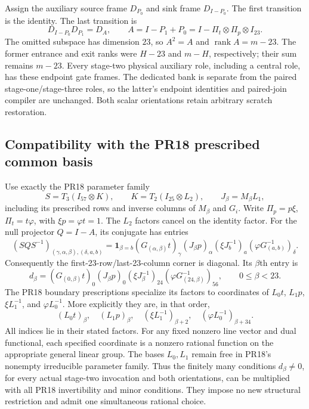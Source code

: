 Assign the auxiliary source frame $D_{P_0}$ and sink frame $D_{I-P_0}$.
The first transition is the identity.  The last transition is
\[
 D_{I-P_0}D_{P_1}=D_A,\qquad
 A=I-P_1+P_0
   =I-\Pi_t\otimes\Pi_p\otimes I_{23}.
\]
The omitted subspace has dimension $23$, so $A^2=A$ and
$\operatorname{rank}A=m-23$.  The former entrance and exit ranks were
$H-23$ and $m-H$, respectively; their sum remains $m-23$.
Every stage-two physical auxiliary role, including a central role,
has these endpoint gate frames.  The dedicated bank is separate from
the paired stage-one/stage-three roles, so the latter's endpoint
identities and paired-join compiler are unchanged.  Both scalar
orientations retain arbitrary scratch restoration.

\subsection{Compatibility with the PR18 prescribed common basis}
\label{sec:partial-swap-source-basis-extension}

Use exactly the PR18 parameter family
\[
 S=T_3(I_{57}\otimes K),\qquad
 K=T_2(I_{25}\otimes L_2),\qquad J_\beta=M_\beta L_1,
\]
including its prescribed rows and inverse columns of $M_\beta$ and
$G_i$.  Write $\Pi_p=p\xi$, $\Pi_t=t\varphi$, with
$\xi p=\varphi t=1$.  The $L_2$ factors cancel on the identity factor.
For the null projector $Q=I-A$, its conjugate has entries
\[
 (SQS^{-1})_{(\gamma,\alpha,\beta),(\delta,a,b)}
 =\mathbf1_{\beta=b}
 (G_{(\alpha,\beta)}t)_\gamma
 (J_\beta p)_\alpha
 (\xi J_b^{-1})_a
 (\varphi G_{(a,b)}^{-1})_\delta.
\]
Consequently the first-23-row/last-23-column corner is diagonal.
Its $\beta$th entry is
\[
 d_\beta=(G_{(0,\beta)}t)_0(J_\beta p)_0
 (\xi J_\beta^{-1})_{24}
 (\varphi G_{(24,\beta)}^{-1})_{56},\qquad0\le\beta<23.
\]
The PR18 boundary prescriptions specialize its factors to coordinates
of $L_0t$, $L_1p$, $\xi L_1^{-1}$, and $\varphi L_0^{-1}$.
More explicitly they are, in that order,
\[
 (L_0t)_\beta,\quad (L_1p)_\beta,\quad
 (\xi L_1^{-1})_{\beta+2},\quad
 (\varphi L_0^{-1})_{\beta+34}.
\]
All indices lie in their stated factors.  For any fixed nonzero line
vector and dual functional, each specified coordinate is a nonzero
rational function on the appropriate general linear group.  The bases
$L_0,L_1$ remain free in PR18's nonempty irreducible parameter family.
Thus the finitely many conditions $d_\beta\ne0$, for every actual
stage-two invocation and both orientations, can be multiplied with
all PR18 invertibility and minor conditions.  They impose no new
structural restriction and admit one simultaneous rational choice.

